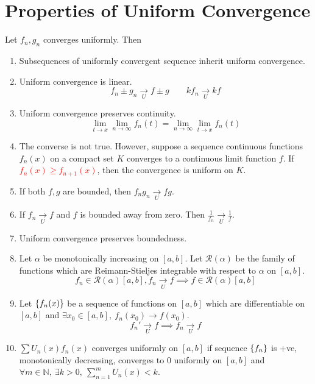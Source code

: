 \section{Properties of Uniform Convergence}
		Let $f_n,g_n$ converges uniformly. Then
\begin{enumerate}
	\item Subsequences of uniformly convergent sequence inherit uniform convergence.
	\item Uniform convergence is linear.
	$$f_n \pm g_n \underset{U}\to f \pm g \qquad kf_n \underset{U}{\to} kf$$
	\item Uniform convergence preserves continuity.
	$$\lim_{t \to x} \lim_{n \to \infty} f_n(t) = \lim_{n \to \infty} \lim_{t \to x} f_n(t)$$
\item The converse is not true. However, suppose a sequence continuous functions $f_n(x)$ on a compact set $K$ converges to a continuous limit function $f$. If \textcolor{red}{$f_n(x) \ge f_{n+1}(x)$}, then the convergence is uniform on $K$.%
	\item If both $f,g$ are bounded, then $f_ng_n \underset{U}{\to} fg$.
	\item If $f_n \underset{U}{\to} f$ and $f$ is bounded away from zero. Then $\frac{1}{f_n} \underset{U}{\to} \frac{1}{f}$.
	\item Uniform convergence preserves boundedness.
	\item Let $\alpha$ be monotonically increasing on $[a,b]$. Let $\mathscr{R}(\alpha)$ be the family of functions which are Reimann-Stieljes integrable with respect to $\alpha$ on $[a,b]$.
	$$f_n \in \mathscr{R}(\alpha)[a,b], f_n \underset{U}{\to} f \implies f \in \mathscr{R}(\alpha)[a,b]$$
	\item Let $\{f_n(x)\}$ be a sequence of functions on $[a,b]$ which are differentiable on $[a,b]$ and $\exists x_0 \in [a,b],\ f_n(x_0) \to f(x_0)$.
	$$f_n' \underset{U}{\to} f \implies f_n \underset{U}{\to} f$$
\item $\sum U_n(x) f_n(x)$ converges uniformly on $[a,b]$ if sequence $\{f_n\}$ is +ve, monotonically decreasing, converges to $0$ uniformly on $[a,b]$ and $\forall m \in \mathbb{N},\ \exists k > 0,\ \sum_{n=1}^m U_n(x) < k$.
\end{enumerate}

